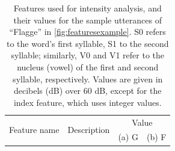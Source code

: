 	
\begin{table}%
		\centering
		\caption[Features used for intensity  analysis]{Features used for intensity analysis, and their values for the sample utterances of ``Flagge'' in \cref{fig:featuresexample}. 
		S0 refers to the word's first syllable, S1 to the second syllable; similarly, V0 and V1 refer to the nucleus (vowel) of the first and second syllable, respectively.
		Values are given in decibels (dB) over 60 dB, except for the index feature, which uses integer values.
		}	
		
		
%		
%	
%	
%	
%		
	\begin{tabularx}{\textwidth}%
		{lXrr}
	\toprule
	\multirow{2}{*}{Feature name} 
					& \multirow{2}{*}{Description}
										& \multicolumn{2}{c}{Value} \\	
				  	&							&  (a) G		& (b) F			\\
	\midrule
	

\end{tabularx}
\end{table}
